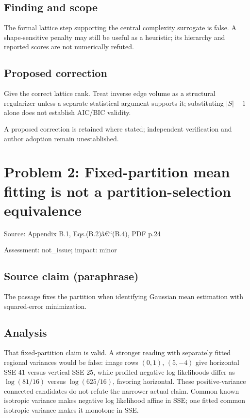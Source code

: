 \documentclass[11pt]{article}
\begin{document}
\subsection*{Finding and scope}

The formal lattice step supporting the central complexity surrogate is false. A shape-sensitive penalty may still be useful as a heuristic; its hierarchy and reported scores are not numerically refuted.

\subsection*{Proposed correction}

Give the correct lattice rank. Treat inverse edge volume as a structural regularizer unless a separate statistical argument supports it; substituting \(|S|-1\) alone does not establish AIC/BIC validity.

A proposed correction is retained where stated; independent verification and author adoption remain unestablished.

\section*{Problem 2: Fixed-partition mean fitting is not a partition-selection equivalence}

Source: Appendix B.1, Eqs.(B.2)â€“(B.4), PDF p.24

Assessment: not\_issue; impact: minor

\subsection*{Source claim (paraphrase)}

The passage fixes the partition when identifying Gaussian mean estimation with squared-error minimization.

\subsection*{Analysis}

That fixed-partition claim is valid. A stronger reading with separately fitted regional variances would be false: image rows \((0,1)\), \((5,-4)\) give horizontal SSE \(41\) versus vertical SSE \(25\), while profiled negative log likelihoods differ as \(\log(81/16)\) versus \(\log(625/16)\), favoring horizontal. These positive-variance connected candidates do not refute the narrower actual claim. Common known isotropic variance makes negative log likelihood affine in SSE; one fitted common isotropic variance makes it monotone in SSE.
\end{document}
